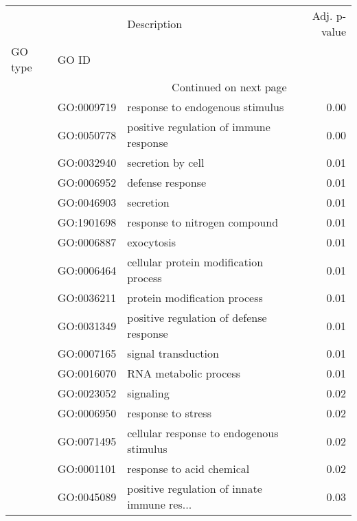 \begin{longtable}{lllr}
\toprule
   &            &                                  Description &  Adj. p-value \\
GO type & GO ID &                                              &               \\
\midrule
\endhead
\midrule
\multicolumn{3}{r}{{Continued on next page}} \\
\midrule
\endfoot

\bottomrule
\endlastfoot
\multirow{24}{*}{BP} & GO:0009719 &              response to endogenous stimulus &          0.00 \\
   & GO:0050778 &       positive regulation of immune response &          0.00 \\
   & GO:0032940 &                            secretion by cell &          0.01 \\
   & GO:0006952 &                             defense response &          0.01 \\
   & GO:0046903 &                                    secretion &          0.01 \\
   & GO:1901698 &                response to nitrogen compound &          0.01 \\
   & GO:0006887 &                                   exocytosis &          0.01 \\
   & GO:0006464 &        cellular protein modification process &          0.01 \\
   & GO:0036211 &                 protein modification process &          0.01 \\
   & GO:0031349 &      positive regulation of defense response &          0.01 \\
   & GO:0007165 &                          signal transduction &          0.01 \\
   & GO:0016070 &                        RNA metabolic process &          0.01 \\
   & GO:0023052 &                                    signaling &          0.02 \\
   & GO:0006950 &                           response to stress &          0.02 \\
   & GO:0071495 &     cellular response to endogenous stimulus &          0.02 \\
   & GO:0001101 &                    response to acid chemical &          0.02 \\
   & GO:0045089 &  positive regulation of innate immune res... &          0.03 \\

\end{longtable}

